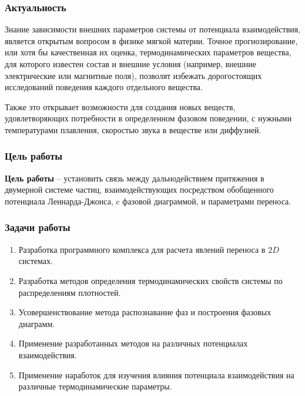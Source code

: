 \documentclass[pdf,hyperref={unicode}]{beamer}
\begin{document}



\begin{frame}
	\transdissolve[duration=0.2]
	\frametitle{Актуальность}
	
	\normalsize{
	
Знание зависимости внешних параметров системы от потенциала взаимодействия, является открытым вопросом в физике мягкой материи. Точное прогнозирование, или хотя бы качественная их оценка, термодинамических параметров вещества, для которого известен состав и внешние условия (например, внешние электрические или магнитные поля), позволят избежать дорогостоящих исследований поведения каждого отдельного вещества. 

Также это открывает возможности для создания новых веществ, удовлетворяющих потребности в определенном фазовом поведении, с нужными температурами плавления, скоростью звука в веществе или диффузией.
	}
	
\end{frame}

\begin{frame}
	\transdissolve[duration=0.2]
	\frametitle{Цель работы}
	
	\textbf{Цель работы} --
установить связь между дальнодействием притяжения в двумерной системе частиц, взаимодействующих посредством обобщенного потенциала Леннарда-Джонса, c фазовой диаграммой, и параметрами переноса.
	
\end{frame}



\begin{frame}
	\transdissolve[duration=0.2]
	\frametitle{Задачи работы}
	\footnotesize{
\begin{enumerate}
\item Разработка программного комплекса для расчета явлений переноса в $2D$ системах.
\item Разработка методов определения термодинамических свойств системы по распределениям плотностей. 
\item Усовершенствование метода распознавание фаз и построения фазовых диаграмм.
\item Применение разработанных методов на различных потенциалах взаимодействия.
\item Применение наработок для изучения влияния потенциала взаимодействия на различные термодинамические параметры.
\end{enumerate}
	}
\end{frame}
\end{document}
